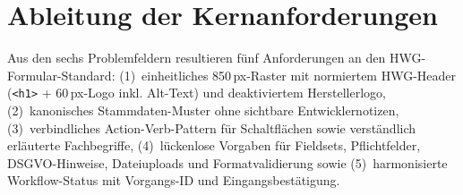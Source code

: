 \section{Ableitung der Kernanforderungen}
\label{sec:ableitung_anforderungen}

Aus den sechs Problemfeldern resultieren fünf Anforderungen an den HWG-Formular-Standard: (1)~einheitliches 850\,px-Raster mit normiertem HWG-Header (\texttt{<h1>} + 60\,px-Logo inkl. Alt-Text) und deaktiviertem Herstellerlogo, (2)~kanonisches Stammdaten-Muster ohne sichtbare Entwicklernotizen, (3)~verbindliches Action-Verb-Pattern für Schaltflächen sowie verständlich erläuterte Fachbegriffe, (4)~lückenlose Vorgaben für Fieldsets, Pflichtfelder, DSGVO-Hinweise, Dateiuploads und Formatvalidierung sowie (5)~harmonisierte Workflow-Status mit Vorgangs-ID und Eingangsbestätigung.
